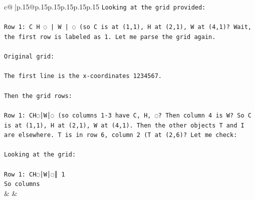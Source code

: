 \documentclass{article}
\begin{document}
{\begin{supertabular}{c@{$\;$}|p{.15\linewidth}@{}p{.15\linewidth}p{.15\linewidth}p{.15\linewidth}p{.15\linewidth}p{.15\linewidth}}
{{{\texttt{Looking at the grid provided:} \\
\\ 
\texttt{Row 1: C H ◌ | W | ◌ (so C is at (1,1), H at (2,1), W at (4,1)? Wait, the first row is labeled as 1. Let me parse the grid again.} \\
\\ 
\texttt{Original grid:} \\
\\ 
\texttt{The first line is the x{-}coordinates 1234567.} \\
\\ 
\texttt{Then the grid rows:} \\
\\ 
\texttt{Row 1: CH◌│W│◌ (so columns 1{-}3 have C, H, ◌? Then column 4 is W? So C is at (1,1), H at (2,1), W at (4,1). Then the other objects T and I are elsewhere. T is in row 6, column 2 (T at (2,6)? Let me check:} \\
\\ 
\texttt{Looking at the grid:} \\
\\ 
\texttt{Row 1: CH◌│W│◌║ 1} \\
\texttt{So columns} \\
            }
        }
    }
    & & \\ \\


\end{supertabular}}
\end{document}
